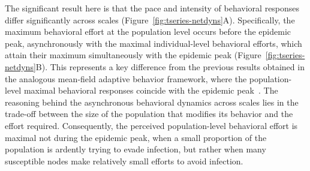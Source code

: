 \documentclass[9pt,twocolumn,twoside]{pnas-new}
\begin{document}
The significant result here is that the pace and intensity of behavioral responses differ significantly across scales (Figure~\ref{fig:tseries-netdyns}A). 
Specifically, the maximum behavioral effort at the population level occurs before the epidemic peak, asynchronously with the maximal individual-level behavioral efforts, which attain their maximum simultaneously with the epidemic peak (Figure~\ref{fig:tseries-netdyns}B).
%
This represents a key difference from the previous results obtained in the analogous mean-field adaptive behavior framework, where the population-level maximal behavioral responses coincide with the epidemic peak~\cite{fenichel2011adaptive,perrings2014merging,espinoza2021adaptive,espinoza2022heterogeneous}.
%
%
The reasoning behind the asynchronous behavioral dynamics across scales lies in the trade-off between the size of the population that modifies its behavior and the effort required.
%
Consequently, the perceived population-level behavioral effort is maximal not during the epidemic peak, when a small proportion of the population is ardently trying to evade infection, but rather when many susceptible nodes make relatively small efforts to avoid infection.
%
\end{document}
